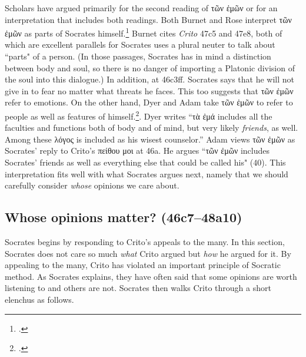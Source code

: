 \documentclass[12pt,letterpaper]{article}
\begin{document}
Scholars have argued primarily for the second reading of \textgreek{τῶν ἐμῶν} or for an interpretation that includes both readings. Both Burnet and Rose interpret \textgreek{τῶν ἐμῶν} as parts of Socrates himself.\footcites[][on 46b5]{burnet1924-euthyphro-apology-crito}[][on 46b4--5]{rose1983} Burnet cites \textit{Crito} 47c5 and 47e8, both of which are excellent parallels for Socrates uses a plural neuter to talk about ``parts" of a person. (In those passages, Socrates has in mind a distinction between body and soul, so there is no danger of importing a Platonic division of the soul into this dialogue.) In addition, at 46c3ff. Socrates says that he will not give in to fear no matter what threats he faces. This too suggests that \textgreek{τῶν ἐμῶν} refer to emotions. On the other hand, Dyer and Adam take \textgreek{τῶν ἐμῶν} to refer to people as well as features of himself.\footcites[][on 46b5]{dyer-apology-crito-2007}[][on 46b6]{adam1988-crito}. Dyer writes ``\textgreek{τὰ ἐμά} includes all the faculties and functions both of body and of mind, but very likely \textit{friends}, as well. Among these \textgreek{λόγος} is included as his wisest counselor.'' Adam views \textgreek{τῶν ἐμῶν} as Socrates' reply to Crito's \textgreek{πείθου μοι} at 46a. He argues ``\textgreek{τῶν ἐμῶν} includes Socrates' friends as well as everything else that could be called his" (40). This interpretation fits well with what Socrates argues next, namely that we should carefully consider \textit{whose} opinions we care about.

\subsection*{Whose opinions matter? (46c7--48a10)}

Socrates begins by responding to Crito's appeals to the many. In this section, Socrates does not care so much \emph{what} Crito argued but \emph{how} he argued for it. By appealing to the many, Crito has violated an important principle of Socratic method. As Socrates explains, they have often said that some opinions are worth listening to and others are not. Socrates then walks Crito through a short elenchus as follows.
\end{document}
